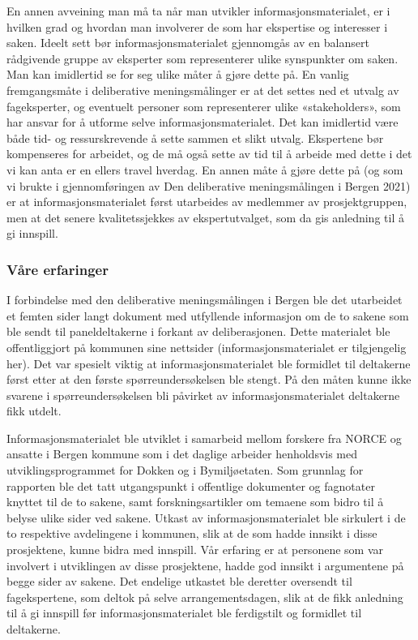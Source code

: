 \documentclass[
  12pt,
  a4paper, 12pt]{article}
\begin{document}
En annen avveining man må ta når man utvikler informasjonsmaterialet, er i hvilken grad og hvordan man involverer de som har ekspertise og interesser i saken. Ideelt sett bør informasjonsmaterialet gjennomgås av en balansert rådgivende gruppe av eksperter som representerer ulike synspunkter om saken. Man kan imidlertid se for seg ulike måter å gjøre dette på. En vanlig fremgangsmåte i deliberative meningsmålinger er at det settes ned et utvalg av fageksperter, og eventuelt personer som representerer ulike «stakeholders», som har ansvar for å utforme selve informasjonsmaterialet. Det kan imidlertid være både tid- og ressurskrevende å sette sammen et slikt utvalg. Ekspertene bør kompenseres for arbeidet, og de må også sette av tid til å arbeide med dette i det vi kan anta er en ellers travel hverdag. En annen måte å gjøre dette på (og som vi brukte i gjennomføringen av Den deliberative meningsmålingen i Bergen 2021) er at informasjonsmaterialet først utarbeides av medlemmer av prosjektgruppen, men at det senere kvalitetssjekkes av ekspertutvalget, som da gis anledning til å gi innspill.

\hypertarget{vuxe5re-erfaringer-3}{%
\subsubsection{Våre erfaringer}\label{vuxe5re-erfaringer-3}}

I forbindelse med den deliberative meningsmålingen i Bergen ble det utarbeidet et femten sider langt dokument med utfyllende informasjon om de to sakene som ble sendt til paneldeltakerne i forkant av deliberasjonen. Dette materialet ble offentliggjort på kommunen sine nettsider (informasjonsmaterialet er tilgjengelig her). Det var spesielt viktig at informasjonsmaterialet ble formidlet til deltakerne først etter at den første spørreundersøkelsen ble stengt. På den måten kunne ikke svarene i spørreundersøkelsen bli påvirket av informasjonsmaterialet deltakerne fikk utdelt.

Informasjonsmaterialet ble utviklet i samarbeid mellom forskere fra NORCE og ansatte i Bergen kommune som i det daglige arbeider henholdsvis med utviklingsprogrammet for Dokken og i Bymiljøetaten. Som grunnlag for rapporten ble det tatt utgangspunkt i offentlige dokumenter og fagnotater knyttet til de to sakene, samt forskningsartikler om temaene som bidro til å belyse ulike sider ved sakene. Utkast av informasjonsmaterialet ble sirkulert i de to respektive avdelingene i kommunen, slik at de som hadde innsikt i disse prosjektene, kunne bidra med innspill. Vår erfaring er at personene som var involvert i utviklingen av disse prosjektene, hadde god innsikt i argumentene på begge sider av sakene. Det endelige utkastet ble deretter oversendt til fagekspertene, som deltok på selve arrangementsdagen, slik at de fikk anledning til å gi innspill før informasjonsmaterialet ble ferdigstilt og formidlet til deltakerne.
\end{document}
